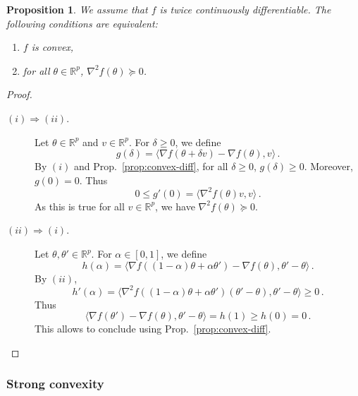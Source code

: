 \documentclass[11pt,reqno]{article}
\newcommand{\R}{\mathbb{R}}
\renewcommand{\leq}{\leqslant}
\renewcommand{\geq}{\geqslant}
\numberwithin{equation}{section}
\theoremstyle{plain}
\newtheorem{proposition}[assumption]{Proposition}
\theoremstyle{definition}
\theoremstyle{remark}
\begin{document}
\begin{proposition}
	\label{prop:convex-2diff}
	We assume that $f$ is twice continuously differentiable. The following conditions are equivalent:
	\begin{enumerate}[label=(\roman*)]
		\item $f$ is convex,
		\item for all $\theta \in \R^p$, $\nabla^2 f(\theta) \succcurlyeq 0$.
	\end{enumerate}
\end{proposition}

\begin{proof}
	\begin{description}
		\item[$(i) \Rightarrow (ii)$.] Let $\theta \in \R^p$ and $v \in \R^p$. For $\delta \geq 0$, we define 
		\begin{equation*}
			g(\delta) = \langle \nabla f(\theta + \delta v) - \nabla f(\theta), v \rangle \, .
		\end{equation*}
		By $(i)$ and Prop.~\ref{prop:convex-diff}, for all $\delta \geq 0$, $g(\delta) \geq 0$. Moreover, $g(0) = 0$. Thus
		\begin{equation*}
			0 \leq g'(0) = \langle \nabla^2 f(\theta) v, v \rangle \, .
		\end{equation*}
		As this is true for all $v \in \R^p$, we have $\nabla^2 f(\theta) \succcurlyeq 0$.
		\item[$(ii) \Rightarrow (i)$.] Let $\theta, \theta' \in \R^p$. For $\alpha \in [0,1]$, we define
		\begin{equation*}
			h(\alpha) = \langle \nabla f((1-\alpha)\theta + \alpha \theta') - \nabla f(\theta), \theta' - \theta \rangle \, .
		\end{equation*} 
		By $(ii)$, 
		\begin{equation*}
			h'(\alpha) = \langle \nabla^2 f((1-\alpha) \theta + \alpha \theta') (\theta' - \theta), \theta' - \theta\rangle \geq 0 \, .
		\end{equation*}
		Thus 
		\begin{equation*}
			\langle \nabla f(\theta') - \nabla f(\theta), \theta' - \theta \rangle = h(1) \geq h(0) = 0 \, .
		\end{equation*}
		This allows to conclude using Prop.~\ref{prop:convex-diff}.
	\end{description}
\end{proof}

\subsubsection{Strong convexity}
\end{document}

